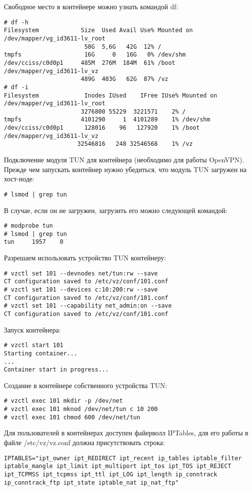 Свободное место в контейнере можно узнать командой df:
\begin{lstlisting}
# df -h
Filesystem            Size  Used Avail Use% Mounted on
/dev/mapper/vg_id3611-lv_root
                       50G  5,6G   42G  12% /
tmpfs                  16G     0   16G   0% /dev/shm
/dev/cciss/c0d0p1     485M  276M  184M  61% /boot
/dev/mapper/vg_id3611-lv_vz
                      489G  403G   62G  87% /vz
# df -i
Filesystem             Inodes IUsed    IFree IUse% Mounted on
/dev/mapper/vg_id3611-lv_root
                      3276800 55229  3221571    2% /
tmpfs                 4101290     1  4101289    1% /dev/shm
/dev/cciss/c0d0p1      128016    96   127920    1% /boot
/dev/mapper/vg_id3611-lv_vz
                     32546816   248 32546568    1% /vz
\end{lstlisting}

Подключение модуля TUN для контейнера (необходимо для работы OpenVPN).
Прежде чем запускать контейнер нужно убедиться, что модуль TUN загружен на хост-ноде:
\begin{lstlisting}
# lsmod | grep tun
\end{lstlisting}

В случае, если он не загружен, загрузить его можно следующей командой:
\begin{lstlisting}
# modprobe tun
# lsmod | grep tun
tun     1957    0
\end{lstlisting}

Разрешаем использовать устройство TUN контейнеру:
\begin{lstlisting}
# vzctl set 101 --devnodes net/tun:rw --save
CT configuration saved to /etc/vz/conf/101.conf
# vzctl set 101 --devices c:10:200:rw --save
CT configuration saved to /etc/vz/conf/101.conf
# vzctl set 101 --capability net_admin:on --save
CT configuration saved to /etc/vz/conf/101.conf
\end{lstlisting}

Запуск контейнера:
\begin{lstlisting}
# vzctl start 101
Starting container...
...
Container start in progress...
\end{lstlisting}

Создание в контейнере собственного устройства TUN:
\begin{lstlisting}
# vzctl exec 101 mkdir -p /dev/net
# vzctl exec 101 mknod /dev/net/tun c 10 200
# vzctl exec 101 chmod 600 /dev/net/tun
\end{lstlisting}

Для пользователей в контейнерах доступен файерволл IPTables, для его работы в файле /etc/vz/vz.conf должна присутствовать строка:
\begin{lstlisting}
IPTABLES="ipt_owner ipt_REDIRECT ipt_recent ip_tables iptable_filter iptable_mangle ipt_limit ipt_multiport ipt_tos ipt_TOS ipt_REJECT ipt_TCPMSS ipt_tcpmss ipt_ttl ipt_LOG ipt_length ip_conntrack ip_conntrack_ftp ipt_state iptable_nat ip_nat_ftp"
\end{lstlisting}

